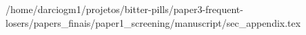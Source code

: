 /home/darciogm1/projetos/bitter-pills/paper3-frequent-losers/papers_finais/paper1_screening/manuscript/sec_appendix.tex